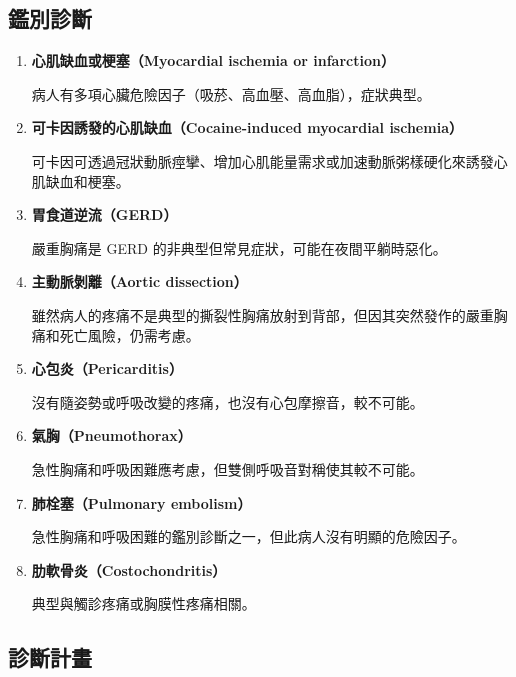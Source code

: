 \documentclass[12pt,a4paper]{article}
\begin{document}
\subsection{鑑別診斷}

\begin{enumerate}
    \item \textbf{心肌缺血或梗塞（Myocardial ischemia or infarction）}
    
    病人有多項心臟危險因子（吸菸、高血壓、高血脂），症狀典型。
    
    \item \textbf{可卡因誘發的心肌缺血（Cocaine-induced myocardial ischemia）}
    
    可卡因可透過冠狀動脈痙攣、增加心肌能量需求或加速動脈粥樣硬化來誘發心肌缺血和梗塞。
    
    \item \textbf{胃食道逆流（GERD）}
    
    嚴重胸痛是 GERD 的非典型但常見症狀，可能在夜間平躺時惡化。
    
    \item \textbf{主動脈剝離（Aortic dissection）}
    
    雖然病人的疼痛不是典型的撕裂性胸痛放射到背部，但因其突然發作的嚴重胸痛和死亡風險，仍需考慮。
    
    \item \textbf{心包炎（Pericarditis）}
    
    沒有隨姿勢或呼吸改變的疼痛，也沒有心包摩擦音，較不可能。
    
    \item \textbf{氣胸（Pneumothorax）}
    
    急性胸痛和呼吸困難應考慮，但雙側呼吸音對稱使其較不可能。
    
    \item \textbf{肺栓塞（Pulmonary embolism）}
    
    急性胸痛和呼吸困難的鑑別診斷之一，但此病人沒有明顯的危險因子。
    
    \item \textbf{肋軟骨炎（Costochondritis）}
    
    典型與觸診疼痛或胸膜性疼痛相關。
\end{enumerate}

\subsection{診斷計畫}
\end{document}
